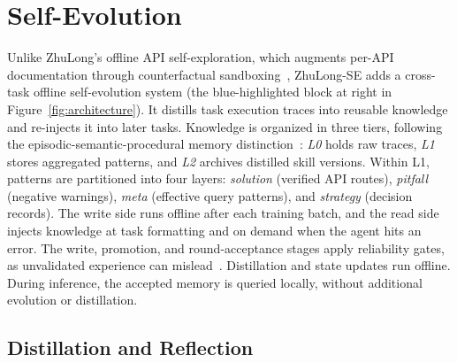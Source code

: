 \section{Self-Evolution}
\label{sec:selfev}

Unlike ZhuLong's offline API self-exploration, which augments per-API documentation through counterfactual sandboxing~\cite{liu2026zhulong}, ZhuLong-SE adds a cross-task offline self-evolution system (the blue-highlighted block at right in Figure~\ref{fig:architecture}). It distills task execution traces into reusable knowledge and re-injects it into later tasks. Knowledge is organized in three tiers, following the episodic-semantic-procedural memory distinction~\cite{sumers2023cognitive}: \emph{L0} holds raw traces, \emph{L1} stores aggregated patterns, and \emph{L2} archives distilled skill versions. Within L1, patterns are partitioned into four layers: \emph{solution} (verified API routes), \emph{pitfall} (negative warnings), \emph{meta} (effective query patterns), and \emph{strategy} (decision records). The write side runs offline after each training batch, and the read side injects knowledge at task formatting and on demand when the agent hits an error. The write, promotion, and round-acceptance stages apply reliability gates, as unvalidated experience can mislead~\cite{zhao2024expel,yang2026skillopt}. Distillation and state updates run offline. During inference, the accepted memory is queried locally, without additional evolution or distillation.

\subsection{Distillation and Reflection}
\label{sec:se_distill}

